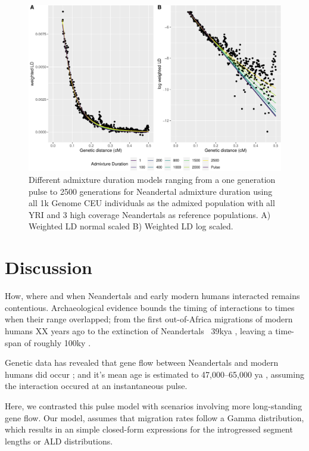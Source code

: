 \documentclass[]{article}
\begin{document}
\begin{figure}
\centering
\includegraphics{Admixture_Time_Inference_Paper_Draft_files/figure-latex/fig5-1.pdf}
\caption{\label{fig:fig5} Different admixture duration models ranging
from a one generation pulse to 2500 generations for Neandertal admixture
duration using all 1k Genome CEU individuals as the admixed population
with all YRI and 3 high coverage Neandertals as reference populations. A) Weighted LD normal scaled B) Weighted LD log scaled.}
\end{figure}

\section{Discussion}\label{discussion}

How, where and when Neandertals and early modern humans interacted remains contentious.  
Archaeological evidence bounds the timing of interactions to times when their range overlapped; from the first out-of-Africa migrations of modern humans XX years ago to the extinction of Neandertals ~39kya \citep{higham_timing_2014}, leaving a time-span of roughly 100ky  \citep{higham_timing_2014}.

Genetic data has revealed that gene flow between Neandertals and modern humans did occur \cite{green_draft_2010}; and it's mean age is estimated to 47,000–65,000 ya \citep{sankararaman_date_2012}, assuming the interaction occured at an instantaneous pulse.

Here, we contrasted this pulse model with scenarios involving more long-standing gene flow.  Our model, assumes that migration rates  follow a Gamma distribution, which results in an simple closed-form expressions for the introgressed segment lengths or ALD  distributions. 
\end{document}
